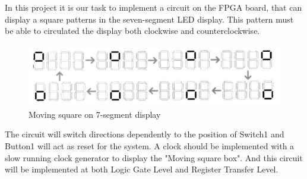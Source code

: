 In this project it is our task to implement a circuit on the FPGA board, that can display a square patterns in the seven-segment LED display. This pattern must be able to  circulated the display both clockwise and counterclockwise.

\begin{figure}[!htbp] 
	\centering 
		\includegraphics[scale=0.4]{fig/DigitBox.jpg} 
	\caption{Moving square on 7-segment display}
	\label{fig:1} 
\end{figure}

The circuit will switch directions dependently to the position of Switch1 and Button1 will act as reset for the system. A clock should be implemented with a slow running clock generator to display the "Moving square box". And this circuit will be implemented at both Logic Gate Level and Register Transfer Level.   
